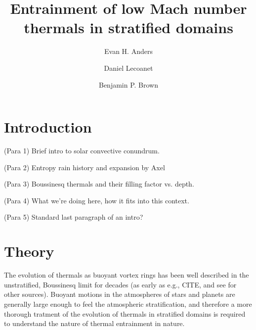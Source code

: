 \documentclass[twocolumn, amsmath, amsfonts, amssymb, trackchanges]{aastex62}
\begin{document}
\title{Entrainment of low Mach number thermals in stratified domains}


\author[0000-0002-3433-4733]{Evan H. Anders}
\author[0000-0002-7635-9728]{Daniel Lecoanet}
\author[0000-0001-8935-219X]{Benjamin P. Brown}


\begin{abstract}
\end{abstract}


\section{Introduction}
\label{sec:intro}
(Para 1) Brief intro to solar convective conundrum.

(Para 2) Entropy rain history and expansion by Axel

(Para 3) Boussinesq thermals and their filling factor vs. depth.

(Para 4) What we're doing here, how it fits into this context.

(Para 5) Standard last paragraph of an intro?

\section{Theory}
\label{sec:theory}
The evolution of thermals as buoyant vortex rings has been well described in
the unstratified, Boussinesq limit for decades (as early as e.g., CITE, and
see \citet{lecoanet&jeevanjee2018} for other sources). Buoyant motions 
in the atmospheres of stars and planets are generally large enough to feel the
atmospheric stratification, and therefore a more thorough tratment of the
evolution of thermals in stratified domains is required to understand the nature
of thermal entrainment in nature.
\end{document}
